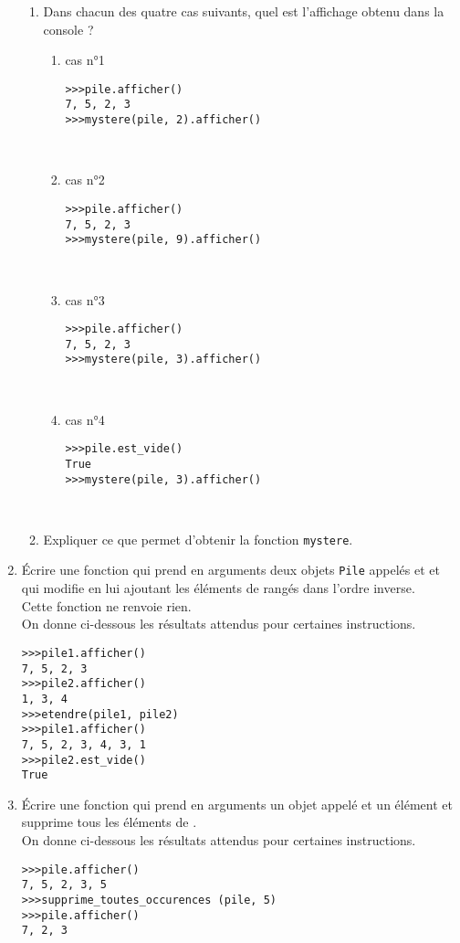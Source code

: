 \documentclass[a4paper,12pt,french]{book}
\begin{document}
\begin{enumerate}[\bfseries 1.]
        \begin{enumerate}[\bfseries a.]
        	\item 	Dans chacun des quatre cas suivants, quel est l’affichage obtenu dans la
            console ?
            \begin{enumerate}[\textbullet]
            	\item cas n°1
\begin{verbatim}
>>>pile.afficher()
7, 5, 2, 3
>>>mystere(pile, 2).afficher()
\end{verbatim}
\ \\
                \item cas n°2
\begin{verbatim}
>>>pile.afficher()
7, 5, 2, 3
>>>mystere(pile, 9).afficher()
\end{verbatim}
\ \\
            	\item 	cas n°3
\begin{verbatim}
>>>pile.afficher()
7, 5, 2, 3
>>>mystere(pile, 3).afficher()
\end{verbatim}
\ \\
            	\item 	cas n°4
\begin{verbatim}
>>>pile.est_vide()
True
>>>mystere(pile, 3).afficher()
\end{verbatim}
\ \\
            \end{enumerate}
        	\item  Expliquer ce que permet d’obtenir la fonction \texttt{mystere}.
        \end{enumerate}
    \item Écrire une fonction  qui prend en arguments deux objets
    \texttt{Pile} appelés  et  et qui modifie  en lui ajoutant les éléments de
     rangés dans l'ordre inverse.\\
    Cette fonction ne renvoie rien.\\
    On donne ci-dessous les résultats attendus pour certaines instructions.
\begin{verbatim}
>>>pile1.afficher()
7, 5, 2, 3
>>>pile2.afficher()
1, 3, 4
>>>etendre(pile1, pile2)
>>>pile1.afficher()
7, 5, 2, 3, 4, 3, 1
>>>pile2.est_vide()
True
\end{verbatim}

\item Écrire une fonction  qui prend en
arguments un objet  appelé  et un élément  et supprime tous les
éléments  de .\\
On donne ci-dessous les résultats attendus pour certaines instructions.
\begin{verbatim}
>>>pile.afficher()
7, 5, 2, 3, 5
>>>supprime_toutes_occurences (pile, 5)
>>>pile.afficher()
7, 2, 3
\end{verbatim}
\end{enumerate}
\end{document}
